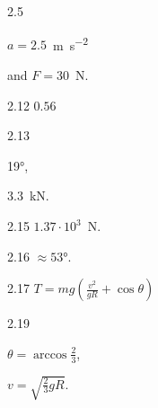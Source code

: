 \protect \section *{\protect {}}
\begin{Solution}{2.{5}}
	\begin{enumerate*}[label = (\alph*)]
	\item $a = 2.5$~\si{\meter\per\square\second}
	\item and $F = 30$~\si{\newton}.
	\end{enumerate*}	
\end{Solution}
\begin{Solution}{2.{12}}
		$0.56$
	
\end{Solution}
\begin{Solution}{2.{13}}
		\begin{enumerate*}[label = (\alph*)]
			\item \ang{19},
			\item $3.3$~\si{\kilo\newton}.
		\end{enumerate*}
	
\end{Solution}
\begin{Solution}{2.{15}}
		$1.37 \cdot 10^3$~\si{\newton}.
	
\end{Solution}
\begin{Solution}{2.{16}}
		$\approx \ang{53}$.
	
\end{Solution}
\begin{Solution}{2.{17}}
		$T = mg \left( \frac{v^2}{gR} + \cos\theta\right) $
	
\end{Solution}
\begin{Solution}{2.{19}}
		\begin{enumerate*}[label = (\alph*)]
			\item $\theta = \arccos\frac23 $,
			\item $v = \sqrt{\frac{2}{3}gR}$.
		\end{enumerate*}
	
\end{Solution}
